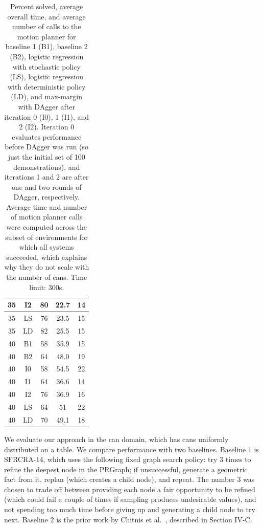 \begin{table}[t]
{\begin{tabular}{ccccc}
    \midrule
      35 & I2 & 80 & 22.7 & 14\\
    \midrule
      35 & LS & 76 & 23.5 & 15\\
    \midrule
      35 & LD & 82 & 25.5 & 15\\
    \midrule[1.5pt]
      40 & B1 & 58 & 35.9 & 15\\
    \midrule
      40 & B2 & 64 & 48.0 & 19\\
    \midrule
      40 & I0 & 58 & 54.5 & 22\\
    \midrule
      40 & I1 & 64 & 36.6 & 14\\
    \midrule
      40 & I2 & 76 & 36.9 & 16\\
    \midrule
      40 & LS & 64 & 51 & 22\\
    \midrule
      40 & LD & 70 & 49.1 & 18\\
    \bottomrule[1.5pt]
  \end{tabular}}
  \caption{\small{Percent solved, average overall time, and average number of calls to the motion
planner for baseline 1 (B1), baseline 2 (B2), logistic regression with stochastic policy (LS), logistic regression with deterministic policy (LD), and max-margin with DAgger after iteration 0 (I0), 1 (I1), and 2 (I2).
Iteration 0 evaluates performance before DAgger was run (so just the initial set of 100 demonstrations),
and iterations 1 and 2 are after one and two rounds of DAgger, respectively. Average time and number of
motion planner calls were computed across the subset of environments for which all systems succeeded, which
explains why they do not scale with the number of cans. Time limit: 300s.}}
  \label{table:results}
\end{table}

We evaluate our approach in the can domain, which has cans uniformly distributed on a table. We
compare performance with two baselines. Baseline 1 is SFRCRA-14, which uses the
following fixed graph search policy: try 3 times to refine the deepest
node in the PRGraph; if unsuccessful, generate a geometric fact from it, replan (which
creates a child node), and repeat. The number 3 was chosen to trade off between providing
each node a fair opportunity to be refined (which could fail a couple of times if sampling produces
undesirable values), and not spending too much time before giving up and generating a child node to try next.
Baseline 2 is the prior work by Chitnis et al.~\cite{chitnis2015mlpc}, described in Section IV-C.

